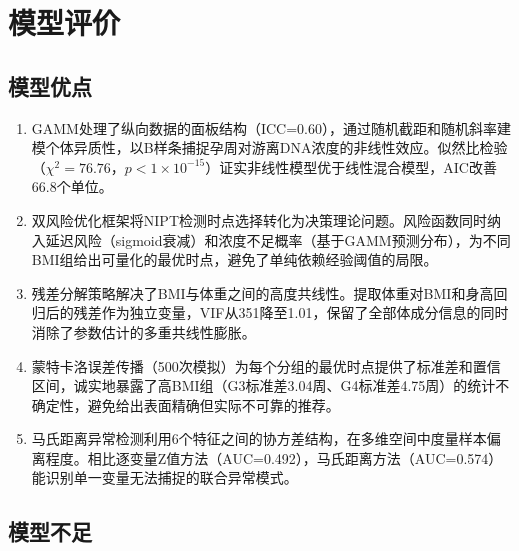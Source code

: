 \section{模型评价}

\subsection{模型优点}

\begin{enumerate}[label=（\arabic*）]
\item GAMM处理了纵向数据的面板结构（ICC=0.60），通过随机截距和随机斜率建模个体异质性，以B样条捕捉孕周对游离DNA浓度的非线性效应。似然比检验（$\chi^2=76.76$，$p<1\times10^{-15}$）证实非线性模型优于线性混合模型，AIC改善66.8个单位。

\item 双风险优化框架将NIPT检测时点选择转化为决策理论问题。风险函数同时纳入延迟风险（sigmoid衰减）和浓度不足概率（基于GAMM预测分布），为不同BMI组给出可量化的最优时点，避免了单纯依赖经验阈值的局限。

\item 残差分解策略解决了BMI与体重之间的高度共线性。提取体重对BMI和身高回归后的残差作为独立变量，VIF从351降至1.01，保留了全部体成分信息的同时消除了参数估计的多重共线性膨胀。

\item 蒙特卡洛误差传播（500次模拟）为每个分组的最优时点提供了标准差和置信区间，诚实地暴露了高BMI组（G3标准差3.04周、G4标准差4.75周）的统计不确定性，避免给出表面精确但实际不可靠的推荐。

\item 马氏距离异常检测利用6个特征之间的协方差结构，在多维空间中度量样本偏离程度。相比逐变量Z值方法（AUC=0.492），马氏距离方法（AUC=0.574）能识别单一变量无法捕捉的联合异常模式。
\end{enumerate}

\subsection{模型不足}

